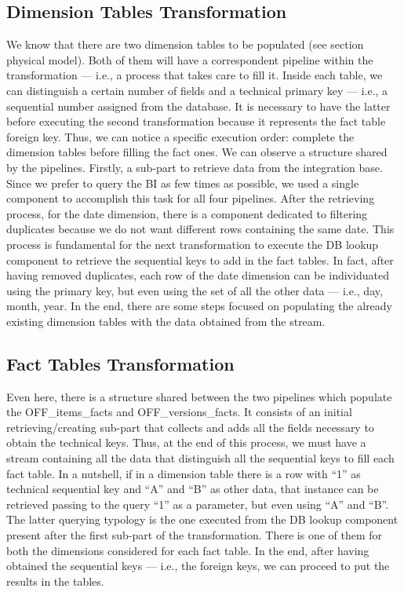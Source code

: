 \documentclass[runningheads]{llncs}
\begin{document}
\subsection{Dimension Tables Transformation}
We know that there are two dimension tables to be populated (see section physical model). Both of them will have a correspondent pipeline within the transformation — i.e., a process that takes care to fill it. Inside each table, we can distinguish a certain number of fields and a technical primary key — i.e., a sequential number assigned from the database. It is necessary to have the latter before executing the second transformation because it represents the fact table foreign key. Thus, we can notice a specific execution order: complete the dimension tables before filling the fact ones.
We can observe a structure shared by the pipelines. Firstly, a sub-part to retrieve data from the integration base. Since we prefer to query the BI as few times as possible, we used a single component to accomplish this task for all four pipelines. After the retrieving process, for the date dimension, there is a component dedicated to filtering duplicates because we do not want different rows containing the same date. This process is fundamental for the next transformation to execute the DB lookup component to retrieve the sequential keys to add in the fact tables. In fact, after having removed duplicates, each row of the date dimension can be individuated using the primary key, but even using the set of all the other data — i.e., day, month, year. In the end, there are some steps focused on populating the already existing dimension tables with the data obtained from the stream.
\subsection{Fact Tables Transformation}
Even here, there is a structure shared between the two pipelines which populate the OFF\_items\_facts and OFF\_versions\_facts. It consists of an initial retrieving/creating sub-part that collects and adds all the fields necessary to obtain the technical keys. Thus, at the end of this process, we must have a stream containing all the data that distinguish all the sequential keys to fill each fact table. In a nutshell, if in a dimension table there is a row with “1” as technical sequential key and “A” and “B” as other data, that instance can be retrieved passing to the query “1” as a parameter, but even using “A” and “B”. The latter querying typology is the one executed from the DB lookup component present after the first sub-part of the transformation. There is one of them for both the dimensions considered for each fact table. In the end, after having obtained the sequential keys — i.e., the foreign keys, we can proceed to put the results in the tables.
\end{document}
